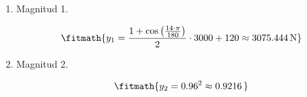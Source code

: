 \begin{enumerate}

\item Magnitud 1.

\[\fitmath{y_{1}=\frac{1+\cos\left(\frac{14\cdot \pi}{180}\right)}{2}\cdot 3000+120\approx 3075.444\,\mathrm{N}}\]

\item Magnitud 2.

\[\fitmath{y_{2}={0.96}^{2}\approx 0.9216\,}\]

\end{enumerate}
